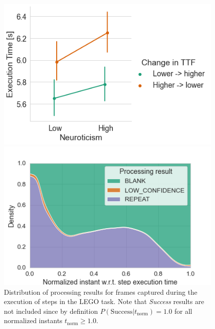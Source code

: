 \begin{figure}
    \begin{minipage}[t]{.45\textwidth}
        \centering
        \includegraphics[width=\textwidth]{Figs/2023EdgeDroid2/model_exectimes_transition}
        \caption{%
            Mean execution times generated by the model after a single step at a \gls{TTF} of \SI{2.5}{\second} preceded by a sequence of \num{25} steps at fixed lower (instantaneous feedback) or higher (\SI{5}{\second}) \gls{TTF}.
            Errorbars indicate \SI{95}{\percent} \glspl{CI}.
        }\label{fig:model:exectimestransitions}
    \end{minipage}%
    \hfill%
    \begin{minipage}[t]{.45\textwidth}
        \centering
        \includegraphics[width=\textwidth]{publications/2023EdgeDroid2/model_data/frame_probabilities}
        \caption{%
            Distribution of processing results for frames captured during the execution of steps in the LEGO task.
            Note that \emph{Success} results are not included since by definition \ensuremath{P(\text{Success}|t_\text{norm}) = 1.0} for all normalized instants \ensuremath{t_\text{norm} \geq 1.0}.
        }\label{fig:modelframes}
    \end{minipage}
\end{figure}


